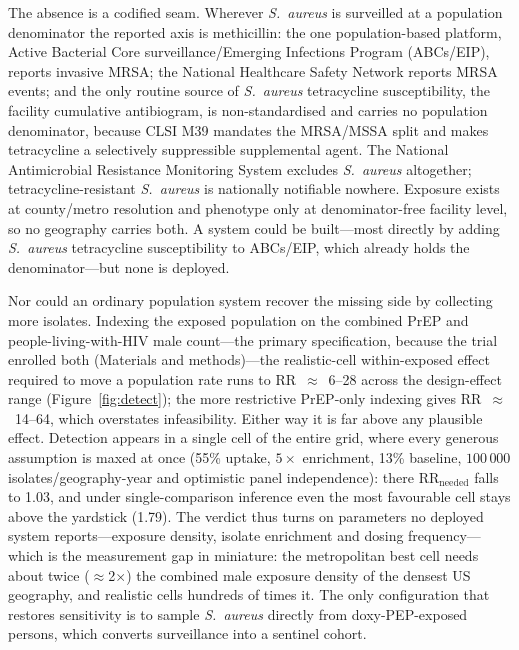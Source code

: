 \documentclass[12pt,a4paper]{article}
\newcommand{\sa}{\emph{S.~aureus}}
\begin{document}
The absence is a codified seam. Wherever \sa{} is surveilled at a population
denominator the reported axis is methicillin: the one population-based platform,
Active Bacterial Core surveillance/Emerging Infections Program (ABCs/EIP),
reports invasive MRSA; the National Healthcare Safety Network reports MRSA events;
and the only routine source of \sa{} tetracycline susceptibility, the facility
cumulative antibiogram, is non-standardised and carries no population
denominator, because CLSI M39 mandates the MRSA/MSSA split and makes tetracycline
a selectively suppressible supplemental agent. The National Antimicrobial
Resistance Monitoring System excludes \sa{} altogether; tetracycline-resistant
\sa{} is nationally notifiable nowhere. Exposure exists at county/metro
resolution and phenotype only at denominator-free facility level, so no geography
carries both. A system could be built---most directly by adding \sa{} tetracycline
susceptibility to ABCs/EIP, which already holds the denominator---but none is
deployed.

Nor could an ordinary population system recover the missing side by collecting
more isolates. Indexing the exposed population on the combined PrEP and
people-living-with-HIV male count---the primary specification, because the trial
enrolled both (Materials and methods)---the realistic-cell within-exposed effect
required to move a population rate runs to RR~$\approx$~6--28 across the
design-effect range (Figure~\ref{fig:detect}); the more restrictive PrEP-only
indexing gives RR~$\approx$~14--64, which overstates infeasibility. Either way it
is far above any plausible effect. Detection appears in a single
cell of the entire grid, where every generous assumption is maxed at once (55\%
uptake, $5\times$ enrichment, 13\% baseline, $100\,000$ isolates/geography-year
and optimistic panel independence): there $\mathrm{RR_{needed}}$ falls to 1.03,
and under single-comparison inference even the most favourable cell stays above
the yardstick (1.79). The verdict thus turns on parameters no deployed system
reports---exposure density, isolate enrichment and dosing frequency---which is the
measurement gap in miniature: the metropolitan best cell needs about twice
($\approx$2$\times$) the combined male exposure density of the densest US
geography, and realistic cells hundreds of times it. The only configuration that restores sensitivity is to
sample \sa{} directly from doxy-PEP-exposed persons, which converts surveillance
into a sentinel cohort.
\end{document}
